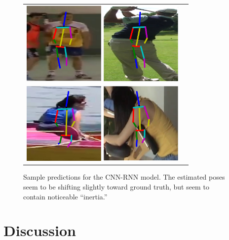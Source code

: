 \documentclass[11pt,twocolumn,letterpaper]{article}
\begin{document}
\begin{figure}
\begin{tabular}{cc}
\includegraphics[width=40mm]{images/rnn_1}
\includegraphics[width=40mm]{images/rnn_2}\\
\includegraphics[width=40mm]{images/rnn_3}
\includegraphics[width=40mm]{images/rnn_4}\\
\end{tabular}
\caption{Sample predictions for the CNN-RNN model. The estimated poses seem to be shifting 
    slightly toward ground truth, but seem to contain noticeable ``inertia.''}
\label{fig:rnn_images}
\end{figure}

\section{Discussion}
\end{document}
